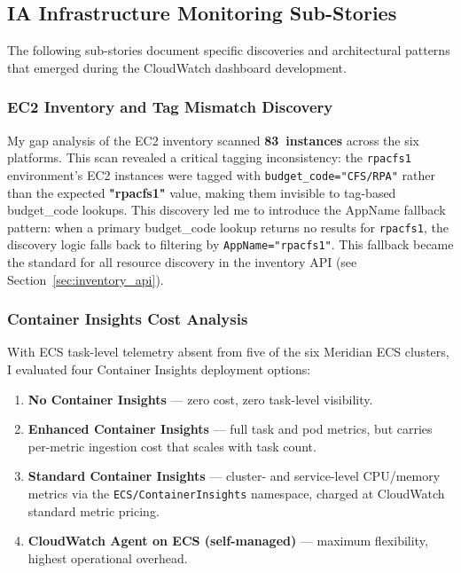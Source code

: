 \subsection{IA Infrastructure Monitoring Sub-Stories}

The following sub-stories document specific discoveries and architectural patterns that emerged during the CloudWatch dashboard development.

\subsubsection{EC2 Inventory and Tag Mismatch Discovery}

My gap analysis of the EC2 inventory scanned \textbf{83~instances} across
the six platforms. This scan revealed a critical tagging
inconsistency: the \texttt{rpacfs1} environment's EC2 instances were
tagged with \texttt{budget\_code="CFS/RPA"} rather than the expected
\textbf{"rpacfs1"} value, making them invisible to tag-based
budget\_code lookups. This discovery led me to introduce the
AppName fallback pattern: when a primary budget\_code
lookup returns no results for \texttt{rpacfs1}, the discovery logic falls
back to filtering by \texttt{AppName="rpacfs1"}. This fallback became
the standard for all resource discovery in the inventory API (see
Section~\ref{sec:inventory_api}).

\subsubsection{Container Insights Cost Analysis}

With ECS task-level telemetry absent from five of the six Meridian ECS
clusters, I evaluated four Container Insights deployment options:

\begin{enumerate}
    \item \textbf{No Container Insights} --- zero cost, zero task-level visibility.
    \item \textbf{Enhanced Container Insights} --- full task and pod metrics, but
          carries per-metric ingestion cost that scales with task count.
    \item \textbf{Standard Container Insights} --- cluster- and service-level
          CPU/memory metrics via the \texttt{ECS/ContainerInsights}
          namespace, charged at CloudWatch standard metric pricing.
    \item \textbf{CloudWatch Agent on ECS (self-managed)} --- maximum flexibility,
          highest operational overhead.
\end{enumerate}

